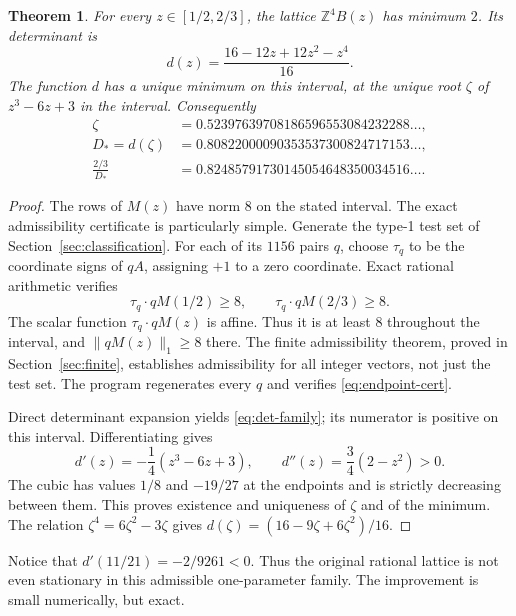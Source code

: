 \documentclass[11pt,reqno]{amsart}
\newtheorem{theorem}{Theorem}[section]
\theoremstyle{definition}
\newcommand{\Z}{\mathbb Z}
\newcommand{\norm}[1]{\lVert #1\rVert_1}
\newcommand{\Dnew}{D_*}
\begin{document}
\begin{theorem}\label{thm:family}
For every $z\in[1/2,2/3]$, the lattice $\Z^4B(z)$ has minimum $2$.
Its determinant is
\begin{equation}\label{eq:det-family}
 d(z)=\frac{16-12z+12z^2-z^4}{16}.
\end{equation}
The function $d$ has a unique minimum on this interval, at the unique
root $\zeta$ of $z^3-6z+3$ in the interval. Consequently
\[
 \begin{split}
 \zeta&=0.52397639708186596553084232288\ldots,\\
 \Dnew=d(\zeta)&=0.80822000090353537300824717153\ldots,\\
 \frac{2/3}{\Dnew}&=0.82485791730145054648350034516\ldots.
 \end{split}
\]
\end{theorem}
\begin{proof}
The rows of $M(z)$ have norm $8$ on the stated interval. The exact
admissibility certificate is particularly simple. Generate the type-1
test set of Section~\ref{sec:classification}. For each of its $1156$ pairs
$q$, choose $\tau_q$ to be the coordinate signs of $qA$, assigning $+1$
to a zero coordinate. Exact rational arithmetic verifies
\begin{equation}\label{eq:endpoint-cert}
 \tau_q\cdot qM(1/2)\ge8,\qquad
 \tau_q\cdot qM(2/3)\ge8.
\end{equation}
The scalar function $\tau_q\cdot qM(z)$ is affine. Thus it is at least
$8$ throughout the interval, and $\norm{qM(z)}\ge8$ there. The finite
admissibility theorem, proved in Section~\ref{sec:finite}, establishes
admissibility for all integer vectors, not just the test set.
The program regenerates every $q$ and verifies \eqref{eq:endpoint-cert}.

Direct determinant expansion yields \eqref{eq:det-family}; its numerator
is positive on this interval. Differentiating gives
\[
 d'(z)=-\frac14(z^3-6z+3),\qquad
 d''(z)=\frac34(2-z^2)>0.
\]
The cubic has values $1/8$ and $-19/27$ at the endpoints and is strictly
decreasing between them. This proves existence and uniqueness of $\zeta$
and of the minimum. The relation $\zeta^4=6\zeta^2-3\zeta$ gives
$d(\zeta)=(16-9\zeta+6\zeta^2)/16$.
\end{proof}

Notice that $d'(11/21)=-2/9261<0$. Thus the original rational lattice is
not even stationary in this admissible one-parameter family. The
improvement is small numerically, but exact.
\end{document}
